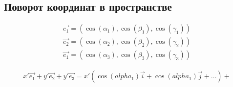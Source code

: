 \documentclass[12pt, a4paper]{article}
\begin{document}
    \subsection{Поворот координат в пространстве}
    
    \begin{gather}
        \vec{e_1} = (\cos(\alpha_1), \cos(\beta_1), \cos(\gamma_1)) \\
        \vec{e_2} = (\cos(\alpha_2), \cos(\beta_2), \cos(\gamma_2)) \\
        \vec{e_1} = (\cos(\alpha_3), \cos(\beta_3), \cos(\gamma_3))
    \end{gather}

    \begin{gather}
        x' \vec{e_1} + y' \vec{e_2} + y' \vec{e_3} = x' (\cos(alpha_1)\vec{i} + \cos(alpha_1)\vec{j} +\ldots) + 
    \end{gather}
\end{document}
